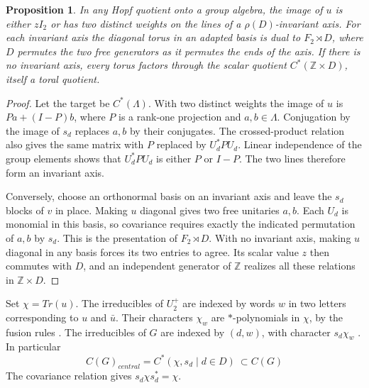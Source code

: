\documentclass[11pt,a4paper]{article}
\newtheorem{prop}[thm]{Proposition}
\theoremstyle{remark}
\begin{document}
\begin{prop}\label{weights}
In any Hopf quotient onto a group algebra, the image of $u$ is either $zI_2$ or has two
distinct weights on the lines of a $\rho(D)$-invariant axis. For each
invariant axis the diagonal torus in an adapted basis is dual to
$F_2\rtimes D$, where $D$ permutes the two free generators as it permutes
the ends of the axis. If there is no invariant axis, every torus factors
through the scalar quotient $C^*(\mathbb Z\times D)$, itself a toral
quotient.
\end{prop}
\begin{proof}
Let the target be $C^*(\Lambda)$. With two distinct weights the image of
$u$ is $Pa+(I-P)b$, where $P$ is a rank-one projection and $a,b\in\Lambda$.
Conjugation by the image of $s_d$ replaces $a,b$ by their conjugates.
The crossed-product relation also gives the same matrix with $P$ replaced
by $U_d^*PU_d$. Linear independence of the group elements shows that
$U_d^*PU_d$ is either $P$ or $I-P$. The two lines therefore form an
invariant axis.

Conversely, choose an orthonormal basis on an invariant axis and leave
the $s_d$ blocks of $v$ in place. Making $u$ diagonal gives two free
unitaries $a,b$. Each $U_d$ is monomial in this basis, so covariance
requires exactly the indicated permutation of $a,b$ by $s_d$. This is the
presentation of $F_2\rtimes D$. With no invariant axis, making $u$
diagonal in any basis forces its two entries to agree. Its scalar value
$z$ then commutes with $D$, and an independent generator of $\mathbb Z$
realizes all these relations in $\mathbb Z\times D$.
\end{proof}

Set $\chi=Tr(u)$. The irreducibles of $U_2^+$ are indexed by words $w$ in
two letters corresponding to $u$ and $\bar u$. Their characters $\chi_w$
are $*$-polynomials in $\chi$, by the fusion rules \cite[Theorem~6.20]{qg}. The
irreducibles of $G$ are indexed by $(d,w)$, with character $s_d\chi_w$
\cite[Theorem~6.1]{fmp}. In particular
\[
 C(G)_{central}=C^*(\chi,s_d\mid d\in D)\ \subset C(G)
\]
The covariance relation gives $s_d\chi s_d^*=\chi$.
\end{document}
